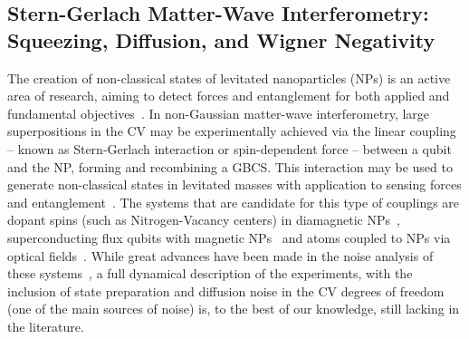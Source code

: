 \documentclass[%
reprint,
superscriptaddress,
nofootinbib,
 amsmath,amssymb,
prx,
floatfix,
]{revtex4-2}
\begin{document}
 
\subsection{Stern-Gerlach Matter-Wave Interferometry: \\Squeezing, Diffusion, and Wigner Negativity \label{subsec:mass}}


The creation of non-classical states of levitated nanoparticles (NPs) is an active area of research, aiming to detect forces and entanglement for both applied and fundamental objectives~\cite{Romero_Isart_quantum_2011,bose_spin_2017,marletto_gravitationally-induced_2017}. In non-Gaussian matter-wave interferometry, large superpositions in the CV may be experimentally achieved via the linear coupling -- known as Stern-Gerlach interaction or spin-dependent force -- between a qubit and the NP, forming and recombining a GBCS. This interaction may be used to generate non-classical states in levitated masses with application to sensing forces and entanglement~\cite{bose_qubit_2006,Romero_Isart_quantum_2011,scala_matter_2013,geraci_sensing_2015,qvarfort_gravimetry_2018,marshman2020mesoscopic,eva_requirements_2023,barker2022entanglement,toros_relative_2021,bose2016matter,bose_spin_2017, marletto_gravitationally-induced_2017}.  The systems that are candidate for this type of couplings are dopant spins (such as Nitrogen-Vacancy centers) in diamagnetic NPs~\cite{scala_matter_2013,yin_large_2013,wan_free_2016,marshman_constructing_2022}, superconducting flux qubits with magnetic NPs~\cite{romero_isart_quantum_2012,nair_massive_2023} and atoms coupled to NPs via optical fields~\cite{toros_creating_2021}. While great advances have been made in the noise analysis of these systems~\cite{scala_matter_2013, pedernales_motional_2020,toros_loss_2020,toros_relative_2021,rijavec_decoherence_2021,tilly_qudits_2021,ma_torque_2021,schut_improving_2022,henkel_internal_2022,henkel_universal_2023,fragolino_decoherence_2023}, a full dynamical description of the experiments, with the inclusion of state preparation and diffusion noise in the CV degrees of freedom (one of the main sources of noise) is, to the best of our knowledge, still lacking in the literature. 
\end{document}
